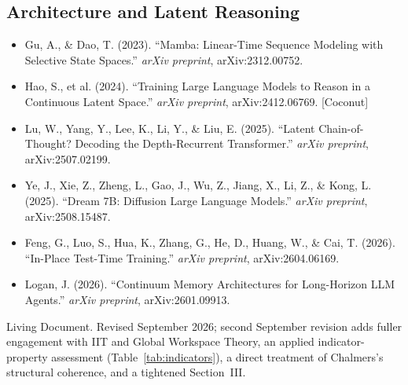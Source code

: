 \documentclass[11pt,letterpaper]{article}
\begin{document}
\subsection*{Architecture and Latent Reasoning}
\begin{itemize}[leftmargin=1.5em]
  \item Gu, A., \& Dao, T. (2023). ``Mamba: Linear-Time Sequence Modeling with Selective State Spaces.'' \textit{arXiv preprint}, arXiv:2312.00752.
  \item Hao, S., et al. (2024). ``Training Large Language Models to Reason in a Continuous Latent Space.'' \textit{arXiv preprint}, arXiv:2412.06769. [Coconut]
  \item Lu, W., Yang, Y., Lee, K., Li, Y., \& Liu, E. (2025). ``Latent Chain-of-Thought? Decoding the Depth-Recurrent Transformer.'' \textit{arXiv preprint}, arXiv:2507.02199.
  \item Ye, J., Xie, Z., Zheng, L., Gao, J., Wu, Z., Jiang, X., Li, Z., \& Kong, L. (2025). ``Dream 7B: Diffusion Large Language Models.'' \textit{arXiv preprint}, arXiv:2508.15487.
  \item Feng, G., Luo, S., Hua, K., Zhang, G., He, D., Huang, W., \& Cai, T. (2026). ``In-Place Test-Time Training.'' \textit{arXiv preprint}, arXiv:2604.06169.
  \item Logan, J. (2026). ``Continuum Memory Architectures for Long-Horizon LLM Agents.'' \textit{arXiv preprint}, arXiv:2601.09913.
\end{itemize}

\vspace{2em}
\begin{center}
{\color{slatecool}\small\sffamily Living Document. Revised September 2026; second September revision adds fuller engagement with IIT and Global Workspace Theory, an applied indicator-property assessment (Table~\ref{tab:indicators}), a direct treatment of Chalmers's structural coherence, and a tightened Section~III.}
\end{center}
\end{document}
